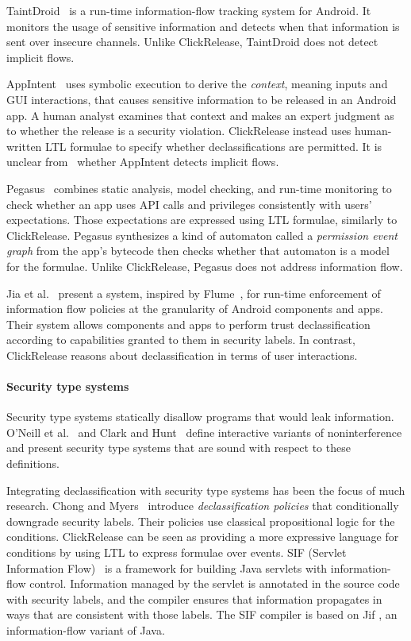 \documentclass{llncs}
\newcommand{\toolname}{ClickRelease\xspace}
\begin{document}
TaintDroid~\cite{Enck:10} is a run-time information-flow tracking system
for Android.  It monitors the usage of sensitive information and detects
when that information is sent over insecure channels.
Unlike \toolname{},
TaintDroid does not detect implicit flows.

AppIntent~\cite{Yang:2013} uses symbolic execution to derive the \emph{context},
meaning inputs and GUI interactions, that causes sensitive information to be
released in an Android app. A human analyst examines that context and makes an
expert judgment as to whether the release is a security violation.  
\toolname instead uses human-written LTL formulae to specify whether 
declassifications are permitted. It is unclear from~\cite{Yang:2013} whether AppIntent detects
implicit flows.

Pegasus~\cite{Chen:13} combines static analysis, model checking,
and run-time monitoring to check whether an app uses API
calls and privileges consistently with users' expectations.
Those expectations are expressed using LTL formulae, similarly to \toolname.
Pegasus synthesizes
a kind of automaton called a \emph{permission event graph} from the
app's bytecode then checks whether that automaton is a model for the formulae.
Unlike \toolname, Pegasus does not address information flow.

Jia et al.~\cite{Jia:13} present a system, inspired by Flume~\cite{Krohn:2007},
for run-time enforcement of information flow policies at the granularity of 
Android components and apps.  Their system allows
components and apps to perform trust declassification according to 
capabilities granted to them in security labels.  In contrast,
\toolname reasons about declassification in terms of user
interactions.

\paragraph*{Security type systems}

Security type systems \cite{Volpano:1996} statically disallow programs
that would leak information. O'Neill et al.~\cite{O'Neill:06} and
Clark and Hunt~\cite{Clark:09} define interactive variants of
noninterference and present security type systems that are sound with
respect to these definitions.

Integrating declassification with security type systems has been the
focus of much research.  Chong and Myers~\cite{Chong:04} introduce
\emph{declassification policies} that conditionally downgrade security labels.
Their policies use classical propositional logic for the conditions.  
\toolname can be seen as providing a more expressive language for
conditions by using LTL to express formulae over events.  
SIF (Servlet Information Flow)~\cite{Chong:07} is a framework for
building Java servlets with information-flow control.  Information
managed by the servlet is annotated in the source code with security
labels, and the compiler ensures that information propagates in ways
that are consistent with those labels.  The SIF compiler is based on
Jif \cite{Myers:1999}, an information-flow variant of Java.
\end{document}
